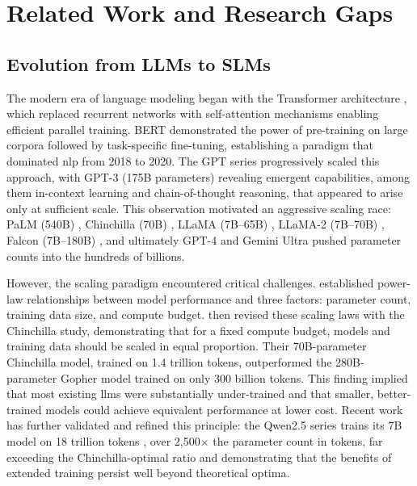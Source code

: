 \section{Related Work and Research Gaps}
\label{section:background}

\subsection{Evolution from LLMs to SLMs}
\label{subsec:background_evolution}
The modern era of language modeling began with the Transformer architecture \citep{vaswani2017attention}, which replaced recurrent networks with self-attention mechanisms enabling efficient parallel training. BERT \citep{devlin2019bert} demonstrated the power of pre-training on large corpora followed by task-specific fine-tuning, establishing a paradigm that dominated \gls{nlp} from 2018 to 2020. The GPT series \citep{brown2020gpt3,radford2019gpt2,openai2023gpt4} progressively scaled this approach, with GPT-3 (175B parameters) revealing emergent capabilities, among them in-context learning and chain-of-thought reasoning, that appeared to arise only at sufficient scale. This observation motivated an aggressive scaling race: PaLM (540B) \citep{chowdhery2023palm}, Chinchilla (70B) \citep{hoffmann2022chinchilla}, LLaMA (7B--65B) \citep{touvron2023llama}, LLaMA-2 (7B--70B) \citep{touvron2023llama2}, Falcon (7B--180B) \citep{almazrouei2023falcon}, and ultimately GPT-4 \citep{openai2023gpt4} and Gemini Ultra \citep{gemini2023} pushed parameter counts into the hundreds of billions.

However, the scaling paradigm encountered critical challenges. \citet{kaplan2020scaling} established power-law relationships between model performance and three factors: parameter count, training data size, and compute budget. \citet{hoffmann2022chinchilla} then revised these scaling laws with the Chinchilla study, demonstrating that for a fixed compute budget, models and training data should be scaled in equal proportion. Their 70B-parameter Chinchilla model, trained on 1.4 trillion tokens, outperformed the 280B-parameter Gopher model trained on only 300 billion tokens. This finding implied that most existing \glspl{llm} were substantially under-trained and that smaller, better-trained models could achieve equivalent performance at lower cost. Recent work has further validated and refined this principle: the Qwen2.5 series trains its 7B model on 18 trillion tokens \citep{qwen2024qwen25}, over 2,500$\times$ the parameter count in tokens, far exceeding the Chinchilla-optimal ratio and demonstrating that the benefits of extended training persist well beyond theoretical optima.

